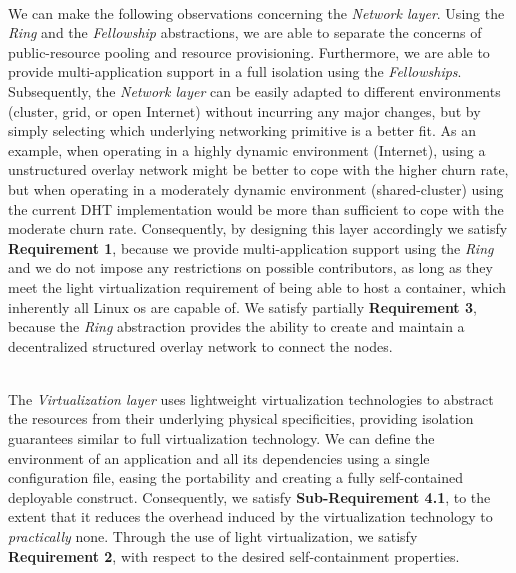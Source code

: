 \documentclass[12pt, titlepage]{uo_temp}
\begin{document}
     \\ We can make the following observations concerning the \emph{Network layer}. Using
     the \emph{Ring} and the \emph{Fellowship} abstractions, we are able to separate the
     concerns of public-resource pooling and resource provisioning. Furthermore, we are
     able to provide multi-application support in a full isolation using the
     \emph{Fellowships}. Subsequently, the \emph{Network layer} can be easily adapted to
     different environments (cluster, grid, or open Internet) without incurring any major
     changes, but by simply selecting which underlying networking primitive is a better
     fit. As an example, when operating in a highly dynamic environment (Internet), using
     a unstructured overlay network might be better to cope with the higher churn rate,
     but when operating in a moderately dynamic environment (shared-cluster) using the
     current DHT implementation would be more than sufficient to cope with the moderate
     churn rate. Consequently, by designing this layer accordingly we satisfy \textbf{Requirement 1},
     because we provide multi-application support using the \emph{Ring} and we do not
     impose any restrictions on possible contributors, as long as they meet the light
     virtualization requirement of being able to host a container, which inherently all
     Linux \gls{os} are capable of. We satisfy partially \textbf{Requirement 3}, because
     the \emph{Ring} abstraction provides the ability to create and maintain a
     decentralized structured overlay network to connect the nodes.

     \\ The \emph{Virtualization layer} uses lightweight virtualization technologies to
     abstract the resources from their underlying physical specificities, providing
     isolation guarantees similar to full virtualization technology. We can define the
     environment of an application and all its dependencies using a single configuration
     file, easing the portability and creating a fully self-contained deployable
     construct.  Consequently, we satisfy \textbf{Sub-Requirement 4.1}, to the extent that
     it reduces the overhead induced by the virtualization technology to
     \emph{practically} none.  Through the use of light virtualization, we satisfy
     \textbf{Requirement 2}, with respect to the desired self-containment properties.
     
\end{document}
